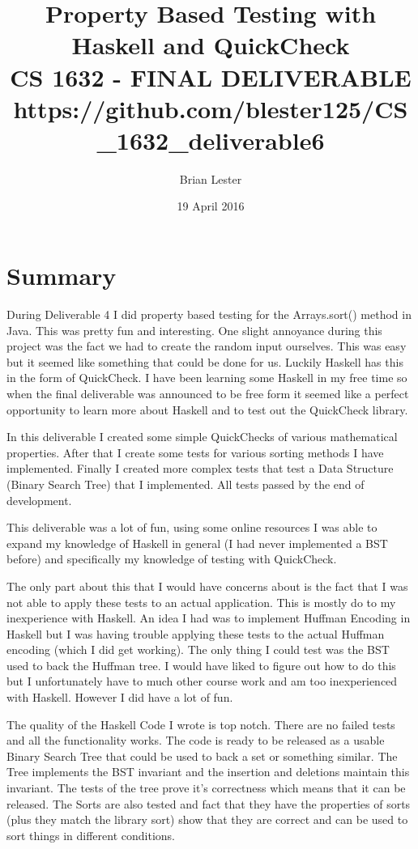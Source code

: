 \documentclass[titlepage]{article}
\title{Property Based Testing with Haskell and QuickCheck\\
CS 1632 - FINAL DELIVERABLE\\
\small{https://github.com/blester125/CS\_1632\_deliverable6}}
\author{Brian Lester}
\date{19 April 2016}
\begin{document}
\maketitle
\section{Summary}
During Deliverable 4 I did property based testing for the Arrays.sort() method in 
Java. This was pretty fun and interesting. One slight annoyance during this 
project was the fact we had to create the random input ourselves. This was easy 
but it seemed like something that could be done for us. Luckily Haskell has this 
in the form of QuickCheck. I have been learning some Haskell in my free time so 
when the final deliverable was announced to be free form it seemed like a perfect 
opportunity to learn more about Haskell and to test out the QuickCheck library.

In this deliverable I created some simple QuickChecks of various mathematical 
properties. After that I create some tests for various sorting methods I have 
implemented. Finally I created more complex tests that test a Data Structure 
(Binary Search Tree) that I implemented. All tests passed by the end of 
development.

This deliverable was a lot of fun, using some online resources I was able to 
expand my knowledge of Haskell in general (I had never implemented a BST before) 
and specifically my knowledge of testing with QuickCheck.

The only part about this that I would have concerns about is the fact that I was 
not able to apply these tests to an actual application. This is mostly do to my 
inexperience with Haskell. An idea I had was to implement Huffman Encoding in 
Haskell but I was having trouble applying these tests to the actual Huffman 
encoding (which I did get working). The only thing I could test was the BST used 
to back the Huffman tree. I would have liked to figure out how to do this but I 
unfortunately have to much other course work and am too inexperienced with 
Haskell. However I did have a lot of fun.

The quality of the Haskell Code I wrote is top notch. There are no failed tests 
and all the functionality works. The code is ready to be released as a usable 
Binary Search Tree that could be used to back a set or something similar. The 
Tree implements the BST invariant and the insertion and deletions maintain this 
invariant. The tests of the tree prove it's correctness which means that it can 
be released. The Sorts are also tested and fact that they have the properties of 
sorts (plus they match the library sort) show that they are correct and can be 
used to sort things in different conditions.
\end{document}
